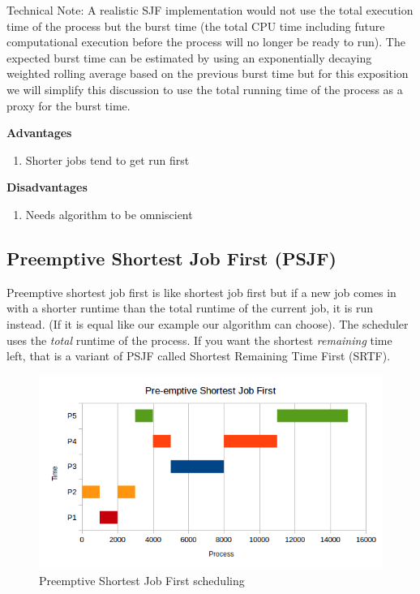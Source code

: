 Technical Note: A realistic SJF implementation would not use the total execution time of the process but the burst time (the total CPU time including future computational execution before the process will no longer be ready to run). The expected burst time can be estimated by using an exponentially decaying weighted rolling average based on the previous burst time but for this exposition we will simplify this discussion to use the total running time of the process as a proxy for the burst time.

\textbf{Advantages} 

\begin{enumerate}
  \item Shorter jobs tend to get run first
\end{enumerate}

\textbf{Disadvantages} 
\begin{enumerate}
  \item Needs algorithm to be omniscient
\end{enumerate}

\subsection{Preemptive Shortest Job First (PSJF)}

Preemptive shortest job first is like shortest job first but if a new job comes in with a shorter runtime than the total runtime of the current job, it is run instead. (If it is equal like our example our algorithm can choose). The scheduler uses the \emph{total} runtime of the process. If you want the shortest \emph{remaining} time left, that is a variant of PSJF called Shortest Remaining Time First (SRTF).

\begin{figure}[htbp]
\centering
\includegraphics[width=\textwidth]{scheduling/images/psjf.png}
\caption{Preemptive Shortest Job First scheduling}
\end{figure}

